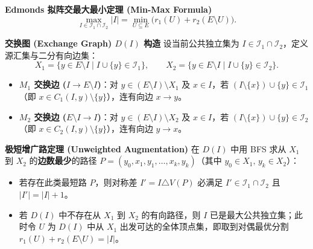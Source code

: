 \textbf{Edmonds 拟阵交最大最小定理 (Min-Max Formula)}
\[
\max_{I\in\mathcal{I}_1\cap\mathcal{I}_2}|I|=\min_{U\subseteq E}\bigl(r_1(U)+r_2(E\setminus U)\bigr).
\]

\textbf{交换图 (Exchange Graph) $D(I)$ 构造}
设当前公共独立集为 $I\in\mathcal{I}_1\cap\mathcal{I}_2$，定义源汇集与二分有向边集：
\[
X_1=\{y\in E\setminus I\mid I\cup\{y\}\in\mathcal{I}_1\},\qquad X_2=\{y\in E\setminus I\mid I\cup\{y\}\in\mathcal{I}_2\}.
\]
\begin{itemize}
    \item \textbf{$M_1$ 交换边 ($I\to E\setminus I$)}：对 $y\in (E\setminus I)\setminus X_1$ 及 $x\in I$，若 $(I\setminus\{x\})\cup\{y\}\in\mathcal{I}_1$（即 $x\in C_1(I,y)\setminus\{y\}$），连有向边 $x\to y$。
    \item \textbf{$M_2$ 交换边 ($E\setminus I\to I$)}：对 $y\in (E\setminus I)\setminus X_2$ 及 $x\in I$，若 $(I\setminus\{x\})\cup\{y\}\in\mathcal{I}_2$（即 $x\in C_2(I,y)\setminus\{y\}$），连有向边 $y\to x$。
\end{itemize}

\textbf{极短增广路定理 (Unweighted Augmentation)}
在 $D(I)$ 中用 BFS 求从 $X_1$ 到 $X_2$ 的\textbf{边数最少}的路径 $P=(y_0,x_1,y_1,\dots,x_k,y_k)$（其中 $y_0\in X_1,\,y_k\in X_2$）：
\begin{itemize}
    \item 若存在此类最短路 $P$，则对称差 $I'=I\triangle V(P)$ 必满足 $I'\in\mathcal{I}_1\cap\mathcal{I}_2$ 且 $|I'|=|I|+1$。
    \item 若 $D(I)$ 中不存在从 $X_1$ 到 $X_2$ 的有向路径，则 $I$ 已是最大公共独立集；此时令 $U$ 为 $D(I)$ 中从 $X_1$ 出发可达的全体顶点集，即取到对偶最优分割 $r_1(U)+r_2(E\setminus U)=|I|$。
\end{itemize}

